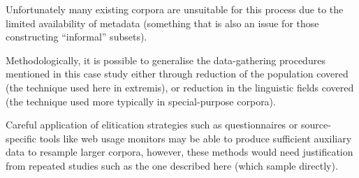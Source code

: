 Unfortunately many existing corpora are unsuitable for this process due to the limited availability of metadata (something that is also an issue for those constructing ``informal'' subsets).

Methodologically, it is possible to generalise the data-gathering procedures mentioned in this case study either through reduction of the population covered (the technique used here in extremis), or reduction in the linguistic fields covered (the technique used more typically in special-purpose corpora).

Careful application of elitication strategies such as questionnaires or source-specific tools like web usage monitors may be able to produce sufficient auxiliary data to resample larger corpora, however, these methods would need justification from repeated studies such as the one described here (which sample directly).
